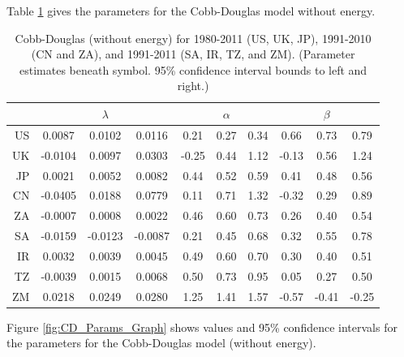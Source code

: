 \documentclass[preprint,authoryear,12pt]{elsarticle}\usepackage{graphicx, color}
\begin{document}
Table \ref{tab:CD_Parameters_No_Energy} gives the parameters for the Cobb-Douglas model without energy.

\begin{table}[ht]
\begin{center}
\caption{Cobb-Douglas (without energy) for 1980-2011 (US, UK, JP), 1991-2010 (CN and ZA), and 1991-2011 (SA, IR, TZ, and ZM). (Parameter estimates beneath symbol. 95\% confidence interval bounds to left and right.)}
\label{tab:CD_Parameters_No_Energy}
{\tiny
\begin{tabular}{r|ccc|ccc|ccc}
  \hline
 &   & $\lambda$ &   &   & $\alpha$ &   &   & $\beta$ &   \\ 
  \hline
US & 0.0087 & 0.0102 & 0.0116 & 0.21 & 0.27 & 0.34 & 0.66 & 0.73 & 0.79 \\ 
  UK & -0.0104 & 0.0097 & 0.0303 & -0.25 & 0.44 & 1.12 & -0.13 & 0.56 & 1.24 \\ 
  JP & 0.0021 & 0.0052 & 0.0082 & 0.44 & 0.52 & 0.59 & 0.41 & 0.48 & 0.56 \\ 
  CN & -0.0405 & 0.0188 & 0.0779 & 0.11 & 0.71 & 1.32 & -0.32 & 0.29 & 0.89 \\ 
  ZA & -0.0007 & 0.0008 & 0.0022 & 0.46 & 0.60 & 0.73 & 0.26 & 0.40 & 0.54 \\ 
  SA & -0.0159 & -0.0123 & -0.0087 & 0.21 & 0.45 & 0.68 & 0.32 & 0.55 & 0.78 \\ 
  IR & 0.0032 & 0.0039 & 0.0045 & 0.49 & 0.60 & 0.70 & 0.30 & 0.40 & 0.51 \\ 
  TZ & -0.0039 & 0.0015 & 0.0068 & 0.50 & 0.73 & 0.95 & 0.05 & 0.27 & 0.50 \\ 
  ZM & 0.0218 & 0.0249 & 0.0280 & 1.25 & 1.41 & 1.57 & -0.57 & -0.41 & -0.25 \\ 
   \hline
\end{tabular}
}
\end{center}
\end{table}



Figure \ref{fig:CD_Params_Graph} shows values and 95\% confidence intervals for the parameters for the Cobb-Douglas model (without energy).
\end{document}
